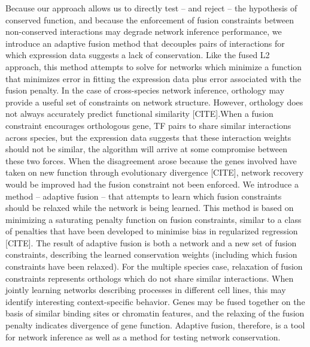 \documentclass[11pt]{article}
\begin{document}
Because our approach allows us to directly test -- and reject -- the hypothesis of conserved function, and because the enforcement of fusion constraints between non-conserved interactions may degrade network inference performance, we introduce an adaptive fusion method that decouples pairs of interactions for which expression data suggests a lack of conservation. Like the fused L2 approach, this method attempts to solve for networks which minimize a function that minimizes error in fitting the expression data plus error associated with the fusion penalty. In the case of cross-species network inference, orthology may provide a useful set of constraints on network structure. However, orthology does not always accurately predict functional similarity [CITE].When a fusion constraint encourages orthologous gene, TF pairs to share similar interactions across species, but the expression data suggests that these interaction weights should not be similar, the algorithm will arrive at some compromise between these two forces. When the disagreement arose because the genes involved have taken on new function through evolutionary divergence [CITE], network recovery would be improved had the fusion constraint not been enforced. We introduce a method -- adaptive fusion -- that attempts to learn which fusion constraints should be relaxed while the network is being learned. This method is based on minimizing a saturating penalty function on fusion constraints, similar to a class of penalties that have been developed to minimise bias in regularized regression [CITE]. The result of adaptive fusion is both a network and a new set of fusion constraints, describing the learned conservation weights (including which fusion constraints have been relaxed). For the multiple species case, relaxation of fusion constraints represents orthologs which do not share similar interactions. When jointly learning networks describing processes in different cell lines, this may identify interesting context-specific behavior. Genes may be fused together on the basis of similar binding sites or chromatin features, and the relaxing of the fusion penalty indicates divergence of gene function. Adaptive fusion, therefore, is a tool for network inference as well as a method for testing network conservation. 
\end{document}
